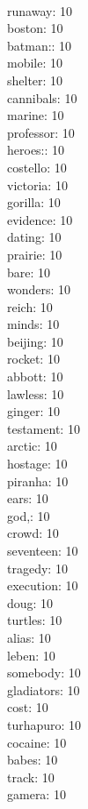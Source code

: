 \begin{multicols}{6}
  \\ runaway: 10
  \\ boston: 10
  \\ batman:: 10
  \\ mobile: 10
  \\ shelter: 10
  \\ cannibals: 10
  \\ marine: 10
  \\ professor: 10
  \\ heroes:: 10
  \\ costello: 10
  \\ victoria: 10
  \\ gorilla: 10
  \\ evidence: 10
  \\ dating: 10
  \\ prairie: 10
  \\ bare: 10
  \\ wonders: 10
  \\ reich: 10
  \\ minds: 10
  \\ beijing: 10
  \\ rocket: 10
  \\ abbott: 10
  \\ lawless: 10
  \\ ginger: 10
  \\ testament: 10
  \\ arctic: 10
  \\ hostage: 10
  \\ piranha: 10
  \\ ears: 10
  \\ god,: 10
  \\ crowd: 10
  \\ seventeen: 10
  \\ tragedy: 10
  \\ execution: 10
  \\ doug: 10
  \\ turtles: 10
  \\ alias: 10
  \\ leben: 10
  \\ somebody: 10
  \\ gladiators: 10
  \\ cost: 10
  \\ turhapuro: 10
  \\ cocaine: 10
  \\ babes: 10
  \\ track: 10
  \\ gamera: 10

\end{multicols}
